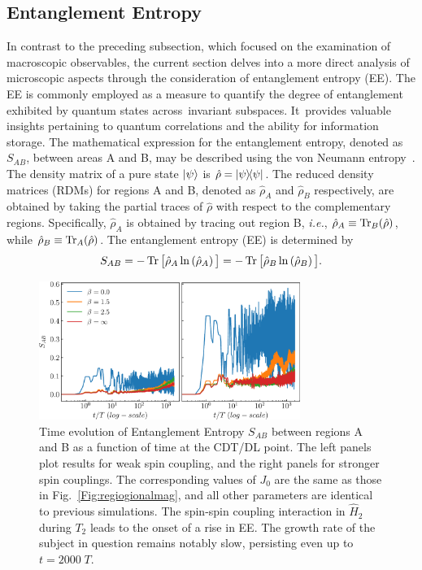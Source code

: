 \documentclass[
nofootinbib,
reprint,
superscriptaddress,
amsmath,amssymb,showkeys,
aps,
prb,
]{revtex4-2}
\begin{document}
	\subsection{\label{sec:level41} Entanglement Entropy}
	In contrast to the preceding subsection, which focused on the examination of macroscopic observables, the current section delves into a more direct analysis of microscopic aspects through the consideration of entanglement entropy (EE). The EE is commonly employed as a measure to quantify the degree of entanglement exhibited by quantum states across invariant subspaces. It provides valuable insights pertaining to quantum correlations and the ability for information storage. The mathematical expression for the entanglement entropy, denoted as $S_{AB}$, between areas A and B, may be described using the von Neumann entropy~\cite{bayat_entanglement_2022,mendes-santos_measuring_2020}.   The density matrix of a pure state $\ket{\psi}$ is $\hat{\rho}= \ketbra{\psi}$. The reduced density matrices (RDMs) for regions A and B, denoted as $\hat{\rho}_A$ and $\hat{\rho}_B$ respectively, are obtained by taking the partial traces of $\hat{\rho}$ with respect to the complementary regions. Specifically, $\hat{\rho}_A$ is obtained by tracing out region B, \textit{i.e.}, $\hat{\rho}_A\equiv \Tr_B(\hat{\rho})$, while $\hat{\rho}_B\equiv\Tr_A(\hat{\rho})$. The entanglement entropy (EE) is determined by
	\begin{equation} 
		S_{AB} = -\Tr\big[\hat{\rho}_A \ln\left(\hat{\rho}_A\right)\big] = -\Tr\big[\hat{\rho}_B \ln\left(\hat{\rho}_B\right)\big].
		\label{eq:vonentrop}
	\end{equation}	
	\begin{figure}
		\begin{center}
			\includegraphics[width=8.5cm]{entangEntrp.pdf}
		\end{center}
		\caption{Time evolution of Entanglement Entropy $S_{AB}$ between regions A and B as a function of time at the CDT/DL point. The left panels plot results for  weak spin coupling, and the right panels for stronger spin couplings. The corresponding values of $J_0$ are the same as those in Fig.~\ref{Fig:regiogionalmag}, and all other parameters are identical to previous simulations. The spin-spin coupling interaction in $\hat{H}_2$ during $T_2$ leads to the onset of a rise in EE. The growth rate of the subject in question remains notably slow, persisting even up to $t=2000\;T$.}
		\label{Fig:entangle}
	\end{figure}
\end{document}
